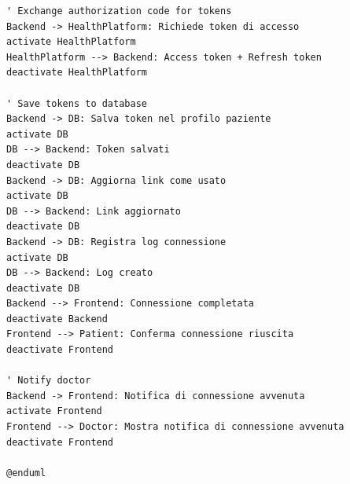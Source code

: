 \documentclass[12pt,a4paper,oneside]{report}
\begin{document}
\begin{lstlisting}[basicstyle=\small\ttfamily, breaklines=true, caption={connessione al dispositivo}]
' Exchange authorization code for tokens
Backend -> HealthPlatform: Richiede token di accesso
activate HealthPlatform
HealthPlatform --> Backend: Access token + Refresh token
deactivate HealthPlatform

' Save tokens to database
Backend -> DB: Salva token nel profilo paziente
activate DB
DB --> Backend: Token salvati
deactivate DB
Backend -> DB: Aggiorna link come usato
activate DB
DB --> Backend: Link aggiornato
deactivate DB
Backend -> DB: Registra log connessione
activate DB
DB --> Backend: Log creato
deactivate DB
Backend --> Frontend: Connessione completata
deactivate Backend
Frontend --> Patient: Conferma connessione riuscita
deactivate Frontend

' Notify doctor
Backend -> Frontend: Notifica di connessione avvenuta
activate Frontend
Frontend --> Doctor: Mostra notifica di connessione avvenuta
deactivate Frontend

@enduml

\end{lstlisting}
\end{document}
